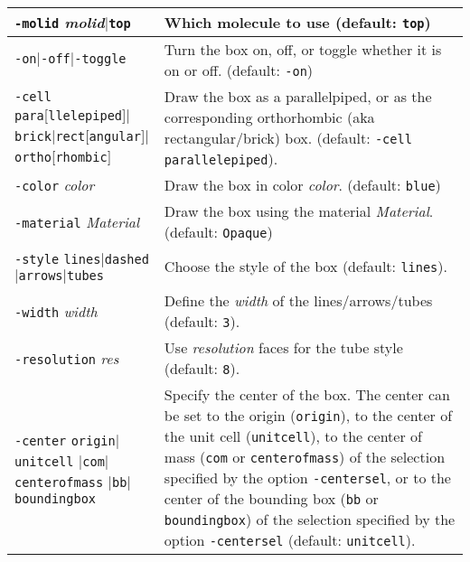 \documentclass[a4paper, DIV12]{scrartcl}
\begin{document}
\begin{tabular}{|p{}|p{}|}
\hline

\texttt{-molid} \textit{molid}$|$\texttt{top}
& Which molecule to use (default: \texttt{top})
\\ \hline

\texttt{-on}$|$\texttt{-off}$|$\texttt{-toggle}
& Turn the box on, off, or toggle whether it is on or off. (default:
\texttt{-on})
\\ \hline

\texttt{-cell} \texttt{para}[\texttt{llelepiped}]$|$\texttt{brick}$|$\texttt{rect}[\texttt{angular}]$|$\texttt{ortho}[\texttt{rhombic}]
& Draw the box as a parallelpiped, or as the corresponding
orthorhombic (aka rectangular/brick) box. (default: \texttt{-cell parallelepiped}).
\\ \hline

\texttt{-color} \textit{color}
& Draw the box in color \textit{color}. (default: \texttt{blue})
\\ \hline

\texttt{-material} \textit{Material}
& Draw the box using the material \textit{Material}. (default: \texttt{Opaque})
\\ \hline


\texttt{-style}
\texttt{lines}$|$\texttt{dashed}$|$\texttt{arrows}$|$\texttt{tubes}
& Choose the style of the box (default: \texttt{lines}).
\\ \hline

\texttt{-width} \textit{width}
& Define the \textit{width} of the lines/arrows/tubes (default:
\texttt{3}). 
\\ \hline

\texttt{-resolution} \textit{res}
& Use \textit{resolution} faces for the tube style (default:
\texttt{8}).
\\ \hline

\texttt{-center} \texttt{origin}$|$\texttt{unitcell}\linebreak
\hspace*{1em}$|$\texttt{com}$|$\texttt{centerofmass}\linebreak 
\hspace*{1em}$|$\texttt{bb}$|$\texttt{boundingbox}
& Specify the center of the box. The center can be set to
the origin (\texttt{origin}), to the center of the unit cell
(\texttt{unitcell}), to the center of mass (\texttt{com} or
\texttt{centerofmass}) of the selection specified by the option
\texttt{-centersel}, or to the center of the bounding box (\texttt{bb}
or \texttt{boundingbox}) of the selection specified by the option
\texttt{-centersel} (default: \texttt{unitcell}).
\\ \hline


\end{tabular}
\end{document}
